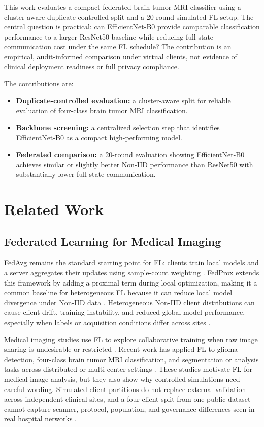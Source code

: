 \documentclass[10pt,twocolumn]{article}
\begin{document}
This work evaluates a compact federated brain tumor MRI classifier using a cluster-aware duplicate-controlled split and a 20-round simulated FL setup. The central question is practical: can EfficientNet-B0 provide comparable classification performance to a larger ResNet50 baseline while reducing full-state communication cost under the same FL schedule? The contribution is an empirical, audit-informed comparison under virtual clients, not evidence of clinical deployment readiness or full privacy compliance.

The contributions are:
\begin{itemize}
    \raggedright
    \setlength{\itemsep}{0.15em}
    \setlength{\parsep}{0pt}
    \item \textbf{Duplicate-controlled evaluation:} a cluster-aware split for reliable evaluation of four-class brain tumor MRI classification.
    \item \textbf{Backbone screening:} a centralized selection step that identifies EfficientNet-B0 as a compact high-performing model.
    \item \textbf{Federated comparison:} a 20-round evaluation showing EfficientNet-B0 achieves similar or slightly better Non-IID performance than ResNet50 with substantially lower full-state communication.
\end{itemize}

\section{Related Work}
\subsection{Federated Learning for Medical Imaging}
FedAvg remains the standard starting point for FL: clients train local models and a server aggregates their updates using sample-count weighting \cite{mcmahan2017fedavg}. FedProx extends this framework by adding a proximal term during local optimization, making it a common baseline for heterogeneous FL because it can reduce local model divergence under Non-IID data \cite{li2020fedprox,ghanta2025federated}. Heterogeneous Non-IID client distributions can cause client drift, training instability, and reduced global model performance, especially when labels or acquisition conditions differ across sites \cite{ghanta2025federated,xu2023federated,naseer2026medfl}.

Medical imaging studies use FL to explore collaborative training when raw image sharing is undesirable or restricted \cite{rieke2020future}. Recent work has applied FL to glioma detection, four-class brain tumor MRI classification, and segmentation or analysis tasks across distributed or multi-center settings \cite{sharma2025privacy,mastoi2025explainable,saraswat2026hybrid,wakili2025twinsegnet}. These studies motivate FL for medical image analysis, but they also show why controlled simulations need careful wording. Simulated client partitions do not replace external validation across independent clinical sites, and a four-client split from one public dataset cannot capture scanner, protocol, population, and governance differences seen in real hospital networks \cite{naseer2026medfl,xu2023federated}.
\end{document}
